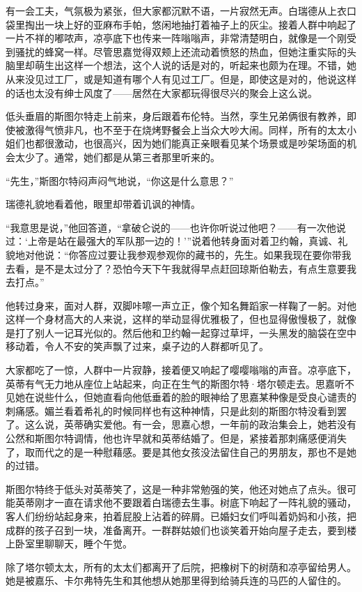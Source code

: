 \par 有一会工夫，气氛极为紧张，但大家都沉默不语，一片寂然无声。白瑞德从上衣口袋里掏出一块上好的亚麻布手帕，悠闲地抽打着袖子上的灰尘。接着人群中响起了一片不祥的嘟哝声，凉亭底下也传来一阵嗡嗡声，非常清楚明白，就像是一个刚受到骚扰的蜂窝一样。尽管思嘉觉得双颊上还流动着愤怒的热血，但她注重实际的头脑里却萌生出这样一个想法，这个人说的话是对的，听起来也颇为在理。不错，她从来没见过工厂，或是知道有哪个人有见过工厂。但是，即使这是对的，他说这样的话也太没有绅士风度了——居然在大家都玩得很尽兴的聚会上这么说。
\par 低头垂眉的斯图尔特走上前来，身后跟着布伦特。当然，孪生兄弟俩很有教养，即使被激得气愤非凡，也不至于在烧烤野餐会上当众大吵大闹。同样，所有的太太小姐们也都很激动，也很高兴，因为她们能真正亲眼看见某个场景或是吵架场面的机会太少了。通常，她们都是从第三者那里听来的。
\par “先生，”斯图尔特闷声闷气地说，“你这是什么意思？”
\par 瑞德礼貌地看着他，眼里却带着讥讽的神情。
\par “我意思是说，”他回答道，“拿破仑说的——也许你听说过他吧？——有一次他说过：‘上帝是站在最强大的军队那一边的！'”说着他转身面对着卫约翰，真诚、礼貌地对他说：“你答应过要让我参观参观你的藏书的，先生。如果我现在要你带我去看，是不是太过分了？恐怕今天下午我就得早点赶回琼斯伯勒去，有点生意要我去打点。”
\par 他转过身来，面对人群，双脚咔嚓一声立正，像个知名舞蹈家一样鞠了一躬。对他这样一个身材高大的人来说，这样的举动显得优雅极了，但也显得傲慢极了，就像是打了别人一记耳光似的。然后他和卫约翰一起穿过草坪，一头黑发的脑袋在空中移动着，令人不安的笑声飘了过来，桌子边的人群都听见了。
\par 大家都吃了一惊，人群中一片寂静，接着便又响起了嘤嘤嗡嗡的声音。凉亭底下，英蒂有气无力地从座位上站起来，向正在生气的斯图尔特·塔尔顿走去。思嘉听不见她在说些什么，但她直看向他低垂着的脸的眼神给了思嘉某种像是受良心谴责的刺痛感。媚兰看着希礼的时候同样也有这种神情，只是此刻的斯图尔特没看到罢了。这么说，英蒂确实爱他。有一会，思嘉心想，一年前的政治集会上，她若没有公然和斯图尔特调情，他也许早就和英蒂结婚了。但是，紧接着那刺痛感便消失了，取而代之的是一种慰藉感。要是其他女孩没法留住自己的男朋友，那也不是她的过错。
\par 斯图尔特终于低头对英蒂笑了，这是一种非常勉强的笑，他还对她点了点头。很可能英蒂刚才一直在请求他不要跟着白瑞德去生事。树底下响起了一阵礼貌的骚动，客人们纷纷站起身来，拍着屁股上沾着的碎屑。已婚妇女们呼叫着奶妈和小孩，把成群的孩子召到一块，准备离开。一群群姑娘们也谈笑着开始向屋子走去，要到楼上卧室里聊聊天，睡个午觉。
\par 除了塔尔顿太太，所有的太太们都离开了后院，把橡树下的树荫和凉亭留给男人。她是被嘉乐、卡尔弗特先生和其他想从她那里得到给骑兵连的马匹的人留住的。
